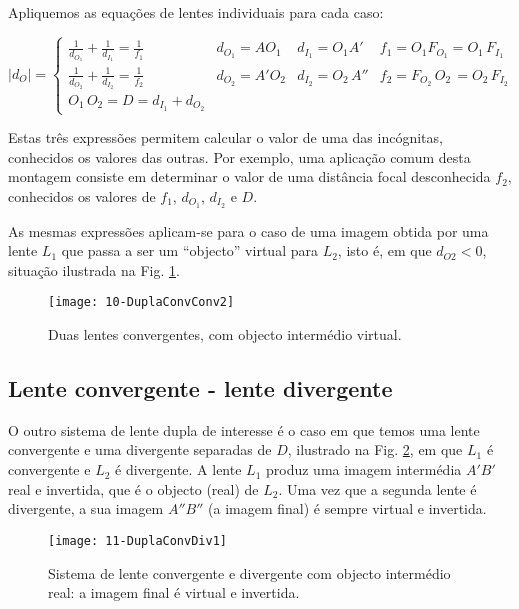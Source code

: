 \documentclass[a4paper,12pt]{article}      %
\begin{document}
Apliquemos as equações de lentes individuais para cada caso:

\begin{equation}
|d_O|  =  \left\{
\begin{array}{llll}
 \frac{1}{d_{O_1}} +  \frac{1}{d_{I_1}}   = \frac{1}{f_1}  & d_{O_1} = AO_1 & d_{I_1} = O_1A' & f_1 = O_1 F_{O_1} = O_1\,F_{I_1} \\
 \frac{1}{d_{O_2}} +  \frac{1}{d_{I_2}}   = \frac{1}{f_2}  & d_{O_2} = A'O_2 & d_{I_2} = O_2\,A'' & f_2 =  F_{O_2}\,O_2\, = O_2\,F_{I_2} \\
O_1\,O_2 = D = d_{I_1} + d_{O_2}
\end{array}  \right.
\label{eq:assoclentes_2}
\end{equation}


Estas três expressões permitem calcular o valor de uma das incógnitas, conhecidos os valores das outras. Por exemplo, uma aplicação comum desta montagem consiste em determinar o valor de uma distância focal desconhecida $f_2$, conhecidos os valores de $f_1$, $d_{O_1}$, $d_{I_2}$ e $D$.

As mesmas expressões aplicam-se para o caso de uma imagem obtida por uma lente $L_1$ que passa a ser um “objecto” virtual para $L_2$, isto é, em que $d_{O2}<0$, situação ilustrada na Fig. \ref{fig:DuplaConvConv2}.

\begin{figure}	[!htb]  \centering 
	\texttt{[image: 10-DuplaConvConv2]}
	\caption{Duas lentes convergentes, com objecto intermédio virtual. \label{fig:DuplaConvConv2}} 
\end{figure}

\subsection{\sf Lente convergente - lente divergente}
O outro sistema de lente dupla de interesse é o caso em que temos uma lente convergente e uma divergente separadas de $D$, ilustrado na Fig. \ref{fig:DuplaConvDiv1}, em que $L_1$ é convergente e $L_2$ é divergente. A lente $L_1$ produz uma imagem intermédia $A'B'$ real e invertida, que é o objecto (real) de $L_2$. Uma vez que a segunda lente é divergente, a sua imagem $A''B''$ (a imagem final) é sempre virtual e invertida.

\begin{figure}	[!htb]  \centering 
	\texttt{[image: 11-DuplaConvDiv1]}
	\caption{Sistema de lente convergente e divergente  com objecto intermédio real: a imagem final é virtual e invertida. \label{fig:DuplaConvDiv1}} 
\end{figure}
\end{document}
